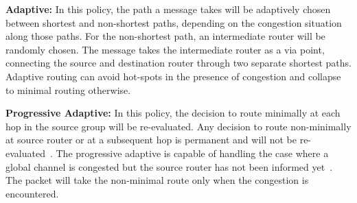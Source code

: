 \textbf{Adaptive:} In this policy, the path a message takes will be adaptively chosen between shortest and non-shortest paths, depending on the congestion situation along those paths. For the non-shortest path, an intermediate router will be randomly chosen. The message takes the intermediate router as a via point, connecting the source and destination router through two separate shortest paths. Adaptive routing can avoid hot-spots in the presence of congestion and collapse to minimal routing otherwise. 

\textbf{Progressive Adaptive:} In this policy, the decision to route minimally at each hop in the source group will be re-evaluated. Any decision to route non-minimally at source router or at a subsequent hop is permanent and will not be re-evaluated~\cite{jiang}. The progressive adaptive is capable of handling the case where a global channel is congested but the source router has not been informed yet~\cite{jiang}. The packet will take the non-minimal route only when the congestion is encountered. 



